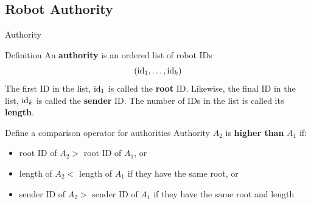 \documentclass[10pt]{beamer}
\newcommand{\id}{{\rm id}}
\begin{document}
\subsection{Robot Authority}
\begin{frame}{Authority}
  \begin{bclogo}[logo=\bccrayon,couleur=orange!10, arrondi=0.2,
    ombre=true]{Definition}
    An \textbf{authority} is an ordered list of robot IDs
    $$(\id_1, \ldots, \id_k) $$
    The first ID in the list, $\id_1$ is called the \textbf{root} ID.
    Likewise, the final ID in the list, $\id_k$ is called the
    \textbf{sender} ID.  The number of IDs in the list is called
    its \textbf{length}.
  \end{bclogo}
  \begin{block}{Define a comparison operator for authorities}
    Authority $A_2$ is \textbf{higher than} $A_1$ if:
    \begin{itemize}
    \item \small{root ID of $A_2 >$ root ID of $A_1$, or}
    \item \small{length of $A_2 <$  length of $A_1$ if they have the same root, or}
    \item \small{sender ID of $A_2 >$ sender ID of $A_1$ if they have the same
    root and length }
  \end{itemize}

       
  \end{block}
\end{frame}

\end{document}
